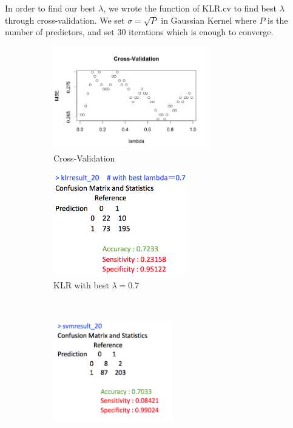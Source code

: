 \documentclass[11pt, oneside]{article}   	%
\begin{document}
In order to find our best $\lambda$, we wrote the function of KLR.cv to find best $\lambda$ through cross-validation. We set $\sigma=\sqrt{P}$ in Gaussian Kernel where $P$ is the number of predictors, and set 30 iterations which is enough to converge.
\begin{figure}[H]
        \centering
        \begin{subfigure}[b]{0.475\textwidth}
            \centering
            \includegraphics[width=\textwidth, height=4.5cm]{lambda_20}
            \caption{Cross-Validation}\label{lambda_20}
        \end{subfigure}
        \hfil
        \begin{subfigure}[b]{0.475\textwidth}
            \centering
            \includegraphics[width=\textwidth, height=4.5cm]{klr_20_best}
            \caption{KLR with best $\lambda=0.7$} \label{klr_20_best}
        \end{subfigure} \\ \hspace{1em}
        \centering
        \begin{subfigure}[b]{0.475\textwidth}
            \centering
            \includegraphics[width=\textwidth, height=4.5cm]{svm_20}

\end{subfigure}
\end{figure}
\end{document}
